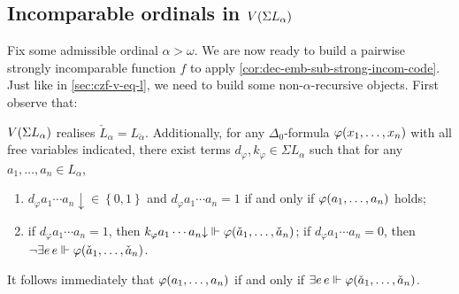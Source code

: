 \documentclass[12pt,openany]{book}
\theoremstyle{plain}
\theoremstyle{definition}
\newcommand\uplabel[1]{\textup{(#1)}}
\newcommand\opE[1]{\mathop{\exists #1}}
\begin{document}
\subsection*{Incomparable ordinals in $V\mleft(\Sigma L_\alpha\mright)$}

Fix some admissible ordinal $\alpha > \omega$. We are now ready to build a pairwise strongly incomparable function $f$ to apply \autoref{cor:dec-emb-sub-strong-incom-code}. Just like in \autoref{sec:czf-v-eq-l}, we need to build some non-$\alpha$-recursive objects. First observe that:
\begin{lemma}
  \label{lem:alpha-rec-real-delta0-correctness}
  $V\mleft(\Sigma L_\alpha\mright)$ realises $\check{L}_\alpha = L_{\check{\alpha}}$. Additionally, for any $\Delta_0$-formula $\varphi\mleft(x_1, \ldots, x_n\mright)$ with all free variables indicated, there exist terms $d_\varphi, k_\varphi \in \Sigma L_\alpha$ such that for any $a_1, \ldots, a_n \in L_\alpha$,
  \begin{enumerate}[label=\uplabel{\roman*}]
    \item $d_\varphi a_1 \cdots a_n {\downarrow} \in \left\{0, 1\right\}$ and $d_\varphi a_1 \cdots a_n = 1$ if and only if $\varphi\mleft(a_1, \ldots, a_n\mright)$ holds;
    \item if $d_\varphi a_1 \cdots a_n = 1$, then $k_\varphi a_1 \cdots a_n {\downarrow} \Vdash \varphi\mleft(\check{a}_1, \ldots, \check{a}_n\mright)$; if $d_\varphi a_1 \cdots a_n = 0$, then $\neg\!\opE{e} e \Vdash \varphi\mleft(\check{a}_1, \ldots, \check{a}_n\mright)$.
  \end{enumerate}

  It follows immediately that $\varphi\mleft(a_1, \ldots, a_n\mright)$ if and only if $\opE{e} e \Vdash \varphi\mleft(\check{a}_1, \ldots, \check{a}_n\mright)$.
\end{lemma}
\end{document}

